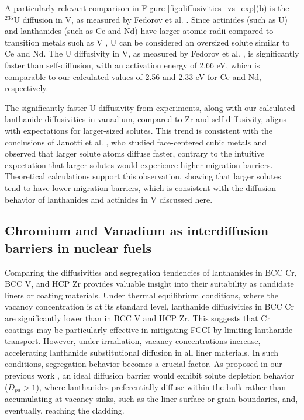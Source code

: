 \documentclass[preprint,12pt]{elsarticle}
\begin{document}
A particularly relevant comparison in Figure
\ref{fig:diffusivities_vs_exp}(b) is the $^{235}$U diffusion in V, as measured by Fedorov et al. \cite{fedorov1971diffusion}. Since actinides (such as U) and lanthanides (such as Ce and Nd) have larger atomic radii compared to transition metals such as V \cite{rahm2016atomic}, U can be considered an oversized solute similar to Ce and Nd. The U diffusivity in V, as measured by Fedorov et al. \cite{fedorov1971diffusion}, is significantly faster than self-diffusion, with an activation energy of 2.66 eV, which is comparable to our calculated values of 2.56 and 2.33 eV for Ce and Nd, respectively.

The significantly faster U diffusivity from experiments, along with our calculated lanthanide diffusivities in vanadium, compared to Zr and self-diffusivity, aligns with expectations for larger-sized solutes. This trend is consistent with the conclusions of Janotti et al. \cite{janotti2004solute}, who studied face-centered cubic metals and observed that larger solute atoms diffuse faster, contrary to the intuitive expectation that larger solutes would experience higher migration barriers. Theoretical calculations \cite{DENG201655,janotti2004solute} support this observation, showing that larger solutes tend to have lower migration barriers, which is consistent with the diffusion behavior of lanthanides and actinides in V discussed here.

\subsection{Chromium and Vanadium as interdiffusion barriers in nuclear fuels}
Comparing the diffusivities and segregation tendencies of lanthanides in BCC Cr, BCC V, and HCP Zr provides valuable insight into their suitability as candidate liners or coating materials. Under thermal equilibrium conditions, where the vacancy concentration is at its standard level, lanthanide diffusivities in BCC Cr are significantly lower than in BCC V and HCP Zr. This suggests that Cr coatings may be particularly effective in mitigating FCCI by limiting lanthanide transport. However, under irradiation, vacancy concentrations increase, accelerating lanthanide substitutional diffusion in all liner materials. In such conditions, segregation behavior becomes a crucial factor. As proposed in our previous work \citep{shousha2024first}, an ideal diffusion barrier would exhibit solute depletion behavior ($D_{pd} > 1$), where lanthanides preferentially diffuse within the bulk rather than accumulating at vacancy sinks, such as the liner surface or grain boundaries, and, eventually, reaching the cladding.
\end{document}
